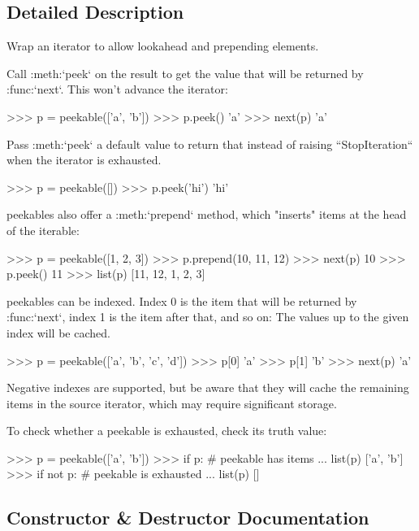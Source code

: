 \subsection{Detailed Description}
\begin{DoxyVerb}Wrap an iterator to allow lookahead and prepending elements.

Call :meth:`peek` on the result to get the value that will be returned
by :func:`next`. This won't advance the iterator:

    >>> p = peekable(['a', 'b'])
    >>> p.peek()
    'a'
    >>> next(p)
    'a'

Pass :meth:`peek` a default value to return that instead of raising
``StopIteration`` when the iterator is exhausted.

    >>> p = peekable([])
    >>> p.peek('hi')
    'hi'

peekables also offer a :meth:`prepend` method, which "inserts" items
at the head of the iterable:

    >>> p = peekable([1, 2, 3])
    >>> p.prepend(10, 11, 12)
    >>> next(p)
    10
    >>> p.peek()
    11
    >>> list(p)
    [11, 12, 1, 2, 3]

peekables can be indexed. Index 0 is the item that will be returned by
:func:`next`, index 1 is the item after that, and so on:
The values up to the given index will be cached.

    >>> p = peekable(['a', 'b', 'c', 'd'])
    >>> p[0]
    'a'
    >>> p[1]
    'b'
    >>> next(p)
    'a'

Negative indexes are supported, but be aware that they will cache the
remaining items in the source iterator, which may require significant
storage.

To check whether a peekable is exhausted, check its truth value:

    >>> p = peekable(['a', 'b'])
    >>> if p:  # peekable has items
    ...     list(p)
    ['a', 'b']
    >>> if not p:  # peekable is exhausted
    ...     list(p)
    []\end{DoxyVerb}
 

\subsection{Constructor \& Destructor Documentation}
\mbox{\label{classsetuptools_1_1__vendor_1_1more__itertools_1_1more_1_1peekable_a266d9ceb455a2762664b49d0a4dd6497}} 
